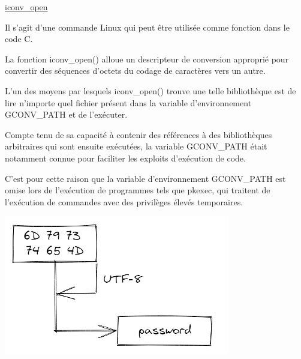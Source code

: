 \documentclass[12pt,a4paper]{article}
\begin{document}
\begin{flushleft}
\begin{center}
                \end{center}
            \item \underline{iconv\_open }
                \item Il s’agit d’une commande Linux qui peut être utilisée comme fonction dans le code C. 
                \item La fonction iconv\_open() alloue un descripteur de conversion approprié pour convertir des séquences d'octets du codage de caractères vers un autre.
                \item 
                \item L’un des moyens par lesquels iconv\_open() trouve une telle bibliothèque est de lire n’importe quel fichier présent dans la variable d’environnement GCONV\_PATH et de l’exécuter. \cite{iconvopenman:online}
                \item Compte tenu de sa capacité à contenir des références à des bibliothèques arbitraires qui sont ensuite exécutées, la variable GCONV\_PATH était notamment connue pour faciliter les exploits d’exécution de code. 
                \item C’est pour cette raison que la variable d’environnement GCONV\_PATH est omise lors de l’exécution de programmes tels que pkexec, qui traitent de l’exécution de commandes avec des privilèges élevés temporaires.
                \begin{center}
                    \includegraphics[scale=0.5]{iconv_open}
                \end{center}
                \cite{iconvman:online}
                \cite{gconvpath:online}

\end{flushleft}
\end{document}
